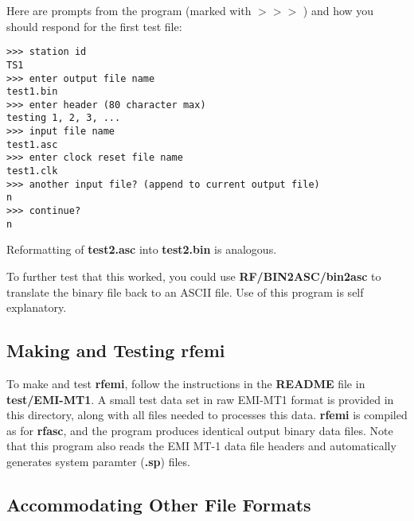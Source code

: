 Here are prompts from the program (marked with $>>>$ )
and how you should respond
for the first test file:
\small
\begin{verbatim}
>>> station id
TS1
>>> enter output file name
test1.bin
>>> enter header (80 character max)
testing 1, 2, 3, ...
>>> input file name
test1.asc
>>> enter clock reset file name
test1.clk
>>> another input file? (append to current output file)
n
>>> continue?
n
\end{verbatim}
\normalsize
Reformatting of {\bf test2.asc} into {\bf test2.bin} is analogous.

To further test that this worked, you could use {\bf RF/BIN2ASC/bin2asc}
to translate the binary file back to an ASCII file.  Use of
this program is self explanatory.

\subsection{Making and Testing rfemi}

To make and test {\bf rfemi}, follow the instructions in the
{\bf README} file in {\bf test/EMI-MT1}.  A small test data
set in raw EMI-MT1 format is provided in this directory,
along with all files needed to processes this data.  {\bf rfemi}
is compiled as for {\bf rfasc}, and the program produces
identical output binary data files.  Note that this program also
reads the EMI MT-1 data file headers and automatically generates
system paramter ({\bf *.sp}) files.

\subsection{Accommodating Other File Formats}

